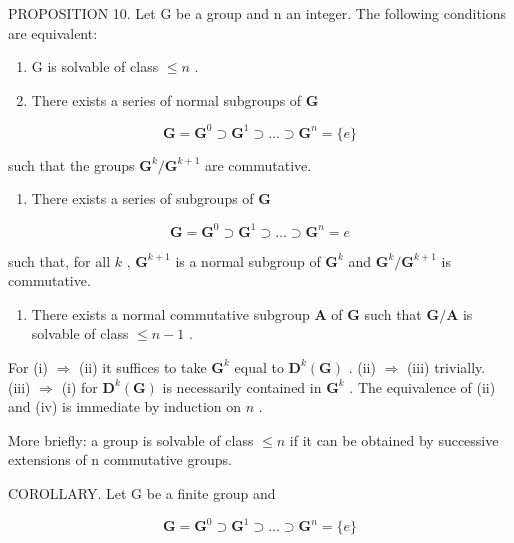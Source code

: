 PROPOSITION 10. Let G be a group and n an integer. The following conditions are equivalent:

\begin{enumerate}
\def\labelenumi{(\roman{enumi})}
\item
  G is solvable of class \(\leqslant n\) .
\item
  There exists a series of normal subgroups of \(\mathbf{G}\)
\end{enumerate}

\[
\mathbf {G} = \mathbf {G} ^ {0} \supset \mathbf {G} ^ {1} \supset \dots \supset \mathbf {G} ^ {n} = \{e \}
\]

such that the groups \(\mathbf{G}^k /\mathbf{G}^{k + 1}\) are commutative.

\begin{enumerate}
\def\labelenumi{(\roman{enumi})}
\setcounter{enumi}{2}
\tightlist
\item
  There exists a series of subgroups of \(\mathbf{G}\)
\end{enumerate}

\[
\mathbf {G} = \mathbf {G} ^ {0} \supset \mathbf {G} ^ {1} \supset \dots \supset \mathbf {G} ^ {n} = e
\]

such that, for all \(k\) , \(\mathbf{G}^{k+1}\) is a normal subgroup of \(\mathbf{G}^k\) and \(\mathbf{G}^k/\mathbf{G}^{k+1}\) is commutative.

\begin{enumerate}
\def\labelenumi{(\roman{enumi})}
\setcounter{enumi}{3}
\tightlist
\item
  There exists a normal commutative subgroup \(\mathbf{A}\) of \(\mathbf{G}\) such that \(\mathbf{G} / \mathbf{A}\) is solvable of class \(\leqslant n - 1\) .
\end{enumerate}

For (i) \(\Rightarrow\) (ii) it suffices to take \(\mathbf{G}^k\) equal to \(\mathbf{D}^k (\mathbf{G})\) . (ii) \(\Rightarrow\) (iii) trivially. (iii) \(\Rightarrow\) (i) for \(\mathbf{D}^k (\mathbf{G})\) is necessarily contained in \(\mathbf{G}^k\) . The equivalence of (ii) and (iv) is immediate by induction on \(n\) .

More briefly: a group is solvable of class \(\leqslant n\) if it can be obtained by successive extensions of n commutative groups.

COROLLARY. Let G be a finite group and

\[
\mathbf {G} = \mathbf {G} ^ {0} \supset \mathbf {G} ^ {1} \supset \dots \supset \mathbf {G} ^ {n} = \{e \}
\]


